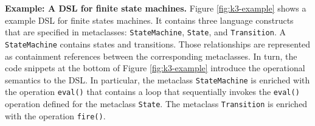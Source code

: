 \begin{itemize}

\end{itemize}
\textbf{Example: A DSL for finite state machines.}
Figure \ref{fig:k3-example} shows a example DSL for finite states machines. It contains three language constructs that are specified in metaclasses: \texttt{StateMachine}, \texttt{State}, and \texttt{Transition}. A \texttt{StateMachine} contains states and transitions. Those relationships are represented as containment references between the corresponding metaclasses. In turn, the code snippets at the bottom of Figure \ref{fig:k3-example} introduce the operational semantics to the DSL. In particular, the metaclass \texttt{StateMachine} is enriched with the operation \texttt{eval()} that contains a loop that sequentially invokes the \texttt{eval()} operation defined for the metaclass \texttt{State}. The metaclass \texttt{Transition} is enriched with the operation \texttt{fire()}.

